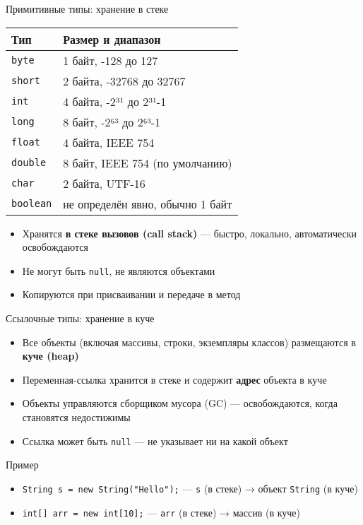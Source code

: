 \documentclass[aspectratio=169]{beamer}
\begin{document}
\begin{frame}{Примитивные типы: хранение в стеке}
  \small
  \begin{tabularx}{\linewidth}{l X}
    \toprule
    \textbf{Тип} & \textbf{Размер и диапазон} \\
    \midrule
    \texttt{byte} & 1 байт, -128 до 127 \\
    \texttt{short} & 2 байта, -32768 до 32767 \\
    \texttt{int} & 4 байта, -2³¹ до 2³¹-1 \\
    \texttt{long} & 8 байт, -2⁶³ до 2⁶³-1 \\
    \texttt{float} & 4 байта, IEEE 754 \\
    \texttt{double} & 8 байт, IEEE 754 (по умолчанию) \\
    \texttt{char} & 2 байта, UTF-16 \\
    \texttt{boolean} & не определён явно, обычно 1 байт \\
    \bottomrule
  \end{tabularx}
  \begin{itemize}
    \item Хранятся \textbf{в стеке вызовов (call stack)} — быстро, локально, автоматически освобождаются
    \item Не могут быть \texttt{null}, не являются объектами
    \item Копируются при присваивании и передаче в метод
  \end{itemize}
\end{frame}

\begin{frame}{Ссылочные типы: хранение в куче}
  \begin{itemize}
    \item Все объекты (включая массивы, строки, экземпляры классов) размещаются в \textbf{куче (heap)}
    \item Переменная-ссылка хранится в стеке и содержит \textbf{адрес} объекта в куче
    \item Объекты управляются сборщиком мусора (GC) — освобождаются, когда становятся недостижимы
    \item Ссылка может быть \texttt{null} — не указывает ни на какой объект
  \end{itemize}
  \begin{block}{Пример}
    \begin{itemize}
      \item \texttt{String s = new String("Hello");} — \texttt{s} (в стеке) → объект \texttt{String} (в куче)
      \item \texttt{int[] arr = new int[10];} — \texttt{arr} (в стеке) → массив (в куче)
    \end{itemize}
  \end{block}
\end{frame}
\end{document}
